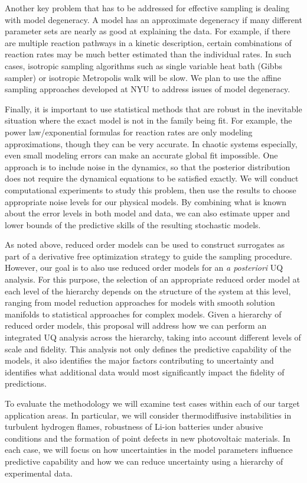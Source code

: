 \documentclass[11pt]{article}
\begin{document}
Another key problem that has to be addressed for effective sampling is dealing with model degeneracy.
A model has an approximate degeneracy if many different parameter sets are nearly as good at explaining the data.
For example, if there are multiple reaction pathways in a kinetic description,
certain combinations of reaction rates may be much better
estimated than the individual rates.
In such cases, isotropic sampling algorithms such as single variable heat bath (Gibbs sampler) or isotropic
Metropolis walk will be slow. We plan to use the affine sampling approaches developed at NYU to address issues of model degeneracy.

Finally, it is important to use statistical methods that are robust in the inevitable situation where the exact model is not in
the family being fit.
For example, the power law/exponential formulas for reaction rates are only modeling approximations, though they can be
very accurate.
In chaotic systems especially, even small modeling errors can make an accurate global fit impossible.
One approach is to include noise in the dynamics, so that the posterior distribution does not require the
dynamical equations to be satisfied exactly.
We will conduct computational experiments to study this problem, then use the results to 
choose appropriate noise levels for our physical models.
By combining what is known about the error levels in both model and data, we can also estimate upper and lower bounds
of the predictive skills of the resulting stochastic models.

As noted above, reduced order models can be used to construct surrogates as part of a derivative free optimization strategy
to guide the sampling procedure. However, our goal is to also use reduced order models for an {\it {a posteriori}} UQ analysis.
For this purpose, the selection of an appropriate reduced order model at each level of the hierarchy depends on the
structure of the system at this level, ranging from model reduction approaches for models with smooth solution manifolds
to statistical approaches for complex models.
Given a hierarchy of reduced order models, this proposal will address how we can perform an integrated UQ analysis 
across the hierarchy, taking into account different levels of scale and fidelity.
This analysis not only defines the predictive capability of the models, it also identifies
the major factors contributing to uncertainty and identifies what additional data would most significantly
impact the fidelity of predictions.

To evaluate the methodology we will examine test cases within each of our target application areas.  In particular,
we will consider thermodiffusive instabilities in turbulent hydrogen flames, robustness of Li-ion batteries under abusive conditions
and the formation of point defects in new photovoltaic materials.  In each case, we will focus on how uncertainties in the 
model parameters influence predictive capability and how we can reduce uncertainty using a hierarchy of experimental data.
\end{document}
